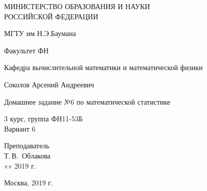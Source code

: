 \documentclass[14pt,a4paper]{scrartcl}
\begin{document}
	\begin{titlepage}
	\begin{center}
		\large
		МИНИСТЕРСТВО ОБРАЗОВАНИЯ И НАУКИ\\ РОССИЙСКОЙ ФЕДЕРАЦИИ
		
		\vspace{0.5cm}
		
		МГТУ им Н.Э.Баумана
		\vspace{0.25cm}
		
		Факультет ФН
		
		Кафедра вычислительной математики и математической физики
		\vfill
		
		
		Соколов Арсений Андреевич\\
		\vfill
		
		
		{\LARGE Домашнее задание №6 по математической статистике\\[2mm]
		}
		\bigskip
		
		3 курс, группа ФН11-53Б\\
		Вариант 6
	\end{center}
	\vfill
	
	\newlength{\ML}
	\hfill\begin{minipage}{0.4\textwidth}
		Преподаватель\\
		\underline{\hspace{3cm}} Т.\,В.~Облакова\\
		«\underline{\hspace{0.7cm}}» \underline{\hspace{1.71cm}} 2019 г.
	\end{minipage}%
	\bigskip
	
	
	\vfill
	
	\begin{center}
		Москва, 2019 г.
	\end{center}
\end{titlepage}
\end{document}
